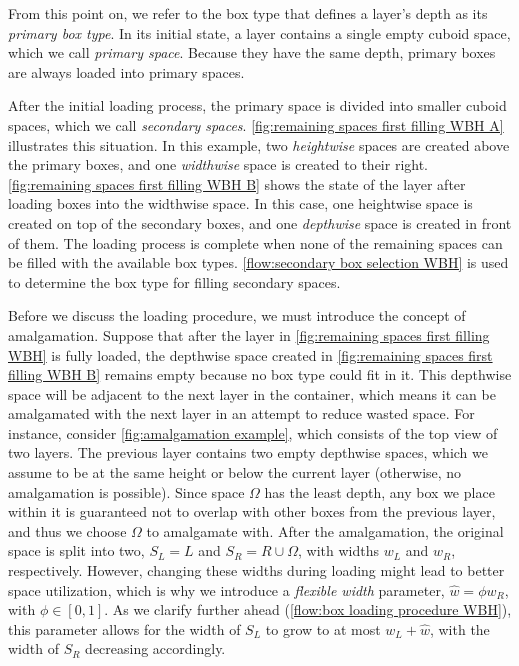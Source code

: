 From this point on, we refer to the box type that defines a layer's depth as its \emph{primary box type}. In its initial state, a layer contains a single empty cuboid space, which we call \emph{primary space}. Because they have the same depth, primary boxes are always loaded into primary spaces.



After the initial loading process, the primary space is divided into smaller cuboid spaces, which we call \emph{secondary spaces}. \cref{fig:remaining spaces first filling WBH A} illustrates this situation. In this example, two \emph{heightwise} spaces are created above the primary boxes, and one \emph{widthwise} space is created to their right. \cref{fig:remaining spaces first filling WBH B} shows the state of the layer after loading boxes into the widthwise space. In this case, one heightwise space is created on top of the secondary boxes, and one \emph{depthwise} space is created in front of them. The loading process is complete when none of the remaining spaces can be filled with the available box types. \cref{flow:secondary box selection WBH} is used to determine the box type for filling secondary spaces.





Before we discuss the loading procedure, we must introduce the concept of amalgamation. Suppose that after the layer in \cref{fig:remaining spaces first filling WBH} is fully loaded, the depthwise space created in \cref{fig:remaining spaces first filling WBH B} remains empty because no box type could fit in it. This depthwise space will be adjacent to the next layer in the container, which means it can be amalgamated with the next layer in an attempt to reduce wasted space. For instance, consider \cref{fig:amalgamation example}, which consists of the top view of two layers. The previous layer contains two empty depthwise spaces, which we assume to be at the same height or below the current layer (otherwise, no amalgamation is possible). Since space $\Omega$ has the least depth, any box we place within it is guaranteed not to overlap with other boxes from the previous layer, and thus we choose $\Omega$ to amalgamate with. After the amalgamation, the original space is split into two, $S_{L} = L$ and $S_{R} = R \cup \Omega$, with widths $w_L$ and $w_R$, respectively. However, changing these widths during loading might lead to better space utilization, which is why we introduce a \emph{flexible width} parameter, $\hat{w} = \phi w_{R}$, with $\phi \in [0,1]$. As we clarify further ahead (\cref{flow:box loading procedure WBH}), this parameter allows for the width of $S_L$ to grow to at most $w_L + \hat{w}$, with the width of $S_R$ decreasing accordingly.


